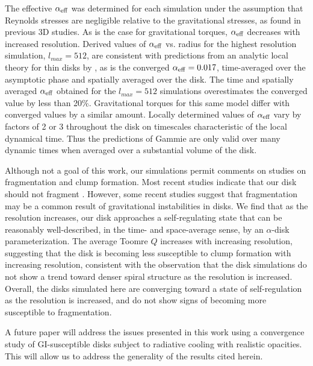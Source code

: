 \documentclass[manuscript]{aastex}
\begin{document}
The effective $\alpha_{\rm{eff}}$ was determined for each simulation under the assumption that
Reynolds stresses are negligible relative to the gravitational stresses, as found in
previous 3D studies.  
As is the case for gravitational torques, $\alpha_{\rm{eff}}$  decreases with increased resolution.  
Derived values of 
$\alpha_{\rm{eff}}$ vs. radius for the highest resolution simulation, $l_{max} = 512$, 
are consistent with
predictions from an analytic local theory for thin disks by \citet{gammie2001}, as is the
converged $\alpha_{\rm{eff}}= 0.017$, time-averaged over the asymptotic phase and spatially averaged 
over the disk. The time and spatially averaged $\alpha_{\rm{eff}}$  
obtained for the $l_{max} = 512$ simulations overestimates the converged value
by less than 20\%.  Gravitational torques for this same model differ with converged values by a
similar amount.
Locally determined values of
$\alpha_{\rm{eff}}$ vary by factors of 2 or 3 throughout the disk on timescales characteristic
of the local dynamical time.  Thus the predictions of Gammie are only valid over many dynamic times when averaged over a substantial volume of the disk.

Although not a goal of this work, our simulations permit
comments on studies on fragmentation and clump formation.
Most recent studies indicate that our disk should not fragment \citep[e.g., ][]{gammie2001, rice2005, mejia2005, boley2008}.   However, some recent studies \citep[e.g., ][]{boss2009, meru2011a}
suggest that fragmentation may be a common result of gravitational instabilities in disks.
We find that as the resolution increases, our disk approaches a self-regulating state that can be reasonably well-described, in the time- and space-average sense, by an $\alpha$-disk parameterization. 
The average Toomre $Q$ increases with increasing resolution,
suggesting that the disk is becoming less susceptible to clump formation with increasing resolution,
consistent with the observation that
the disk simulations do not show a trend toward denser spiral structure as the resolution is increased.
Overall, the disks simulated here are converging toward a state of self-regulation as the resolution is increased, and do not show signs of becoming more susceptible to fragmentation. 
 
A future paper will address the issues presented in this work using a convergence study of GI-susceptible disks subject to radiative cooling with realistic opacities.  This will allow us to address the generality of the results cited herein.
\end{document}
